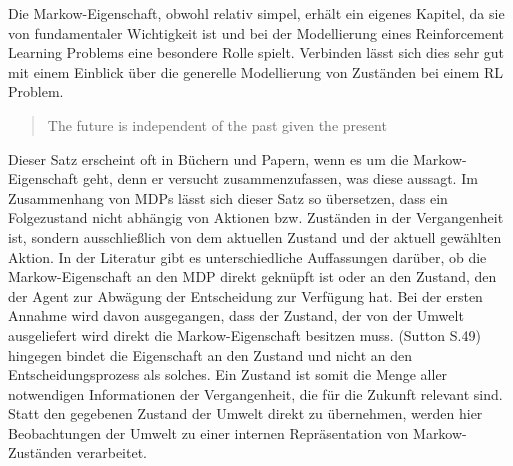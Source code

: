 Die Markow-Eigenschaft, obwohl relativ simpel, erhält ein eigenes Kapitel, da sie von fundamentaler Wichtigkeit ist und bei der Modellierung eines Reinforcement Learning Problems eine besondere Rolle spielt. Verbinden lässt sich dies sehr gut mit einem Einblick über die generelle Modellierung von Zuständen bei einem RL Problem.

\begin{quote}
    The future is independent of the past given the present
  \end{quote}

Dieser Satz erscheint oft in Büchern und Papern, wenn es um die Markow-Eigenschaft geht, denn er versucht zusammenzufassen, was diese aussagt. Im Zusammenhang von MDPs lässt sich dieser Satz so übersetzen, dass ein Folgezustand nicht abhängig von Aktionen bzw. Zuständen in der Vergangenheit ist, sondern ausschließlich von dem aktuellen Zustand und der aktuell gewählten Aktion.
In der Literatur gibt es unterschiedliche Auffassungen darüber, ob die Markow-Eigenschaft an den MDP direkt geknüpft ist oder an den Zustand, den der Agent zur Abwägung der Entscheidung zur Verfügung hat. Bei der ersten Annahme wird davon ausgegangen, dass der Zustand, der von der Umwelt ausgeliefert wird direkt die Markow-Eigenschaft besitzen muss. (Sutton S.49) hingegen bindet die Eigenschaft an den Zustand und nicht an den Entscheidungsprozess als solches. Ein Zustand ist somit die Menge aller notwendigen Informationen der Vergangenheit, die für die Zukunft relevant sind. Statt den gegebenen Zustand der Umwelt direkt zu übernehmen, werden hier Beobachtungen der Umwelt zu einer internen Repräsentation von Markow-Zuständen verarbeitet.



